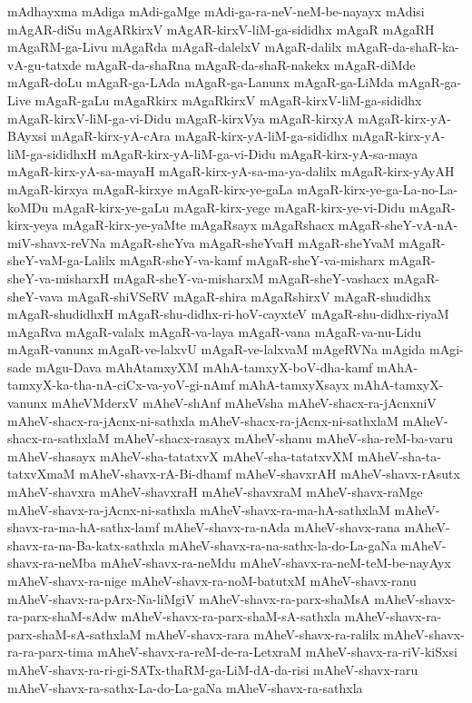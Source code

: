 {mAdhayxma
mAdiga
mAdi-gaMge
mAdi-ga-ra-neV-neM-be-nayayx
mAdisi
mAgAR-diSu
mAgARkirxV
mAgAR-kirxV-liM-ga-sididhx
mAgaR
mAgaRH
mAgaRM-ga-Livu
mAgaRda
mAgaR-dalelxV
mAgaR-dalilx
mAgaR-da-shaR-ka-vA-gu-tatxde
mAgaR-da-shaRna
mAgaR-da-shaR-nakekx
mAgaR-diMde
mAgaR-doLu
mAgaR-ga-LAda
mAgaR-ga-Lanunx
mAgaR-ga-LiMda
mAgaR-ga-Live
mAgaR-gaLu
mAgaRkirx
mAgaRkirxV
mAgaR-kirxV-liM-ga-sididhx
mAgaR-kirxV-liM-ga-vi-Didu
mAgaR-kirxVya
mAgaR-kirxyA
mAgaR-kirx-yA-BAyxsi
mAgaR-kirx-yA-cAra
mAgaR-kirx-yA-liM-ga-sididhx
mAgaR-kirx-yA-liM-ga-sididhxH
mAgaR-kirx-yA-liM-ga-vi-Didu
mAgaR-kirx-yA-sa-maya
mAgaR-kirx-yA-sa-mayaH
mAgaR-kirx-yA-sa-ma-ya-dalilx
mAgaR-kirx-yAyAH
mAgaR-kirxya
mAgaR-kirxye
mAgaR-kirx-ye-gaLa
mAgaR-kirx-ye-ga-La-no-La-koMDu
mAgaR-kirx-ye-gaLu
mAgaR-kirx-yege
mAgaR-kirx-ye-vi-Didu
mAgaR-kirx-yeya
mAgaR-kirx-ye-yaMte
mAgaRsayx
mAgaRshacx
mAgaR-sheY-vA-nA-miV-shavx-reVNa
mAgaR-sheYva
mAgaR-sheYvaH
mAgaR-sheYvaM
mAgaR-sheY-vaM-ga-Lalilx
mAgaR-sheY-va-kamf
mAgaR-sheY-va-misharx
mAgaR-sheY-va-misharxH
mAgaR-sheY-va-misharxM
mAgaR-sheY-vashacx
mAgaR-sheY-vava
mAgaR-shiVSeRV
mAgaR-shira
mAgaRshirxV
mAgaR-shudidhx
mAgaR-shudidhxH
mAgaR-shu-didhx-ri-hoV-cayxteV
mAgaR-shu-didhx-riyaM
mAgaRva
mAgaR-valalx
mAgaR-va-laya
mAgaR-vana
mAgaR-va-nu-Lidu
mAgaR-vanunx
mAgaR-ve-lalxvU
mAgaR-ve-lalxvaM
mAgeRVNa
mAgida
mAgi-sade
mAgu-Dava
mAhAtamxyXM
mAhA-tamxyX-boV-dha-kamf
mAhA-tamxyX-ka-tha-nA-ciCx-va-yoV-gi-nAmf
mAhA-tamxyXsayx
mAhA-tamxyX-vanunx
mAheVMderxV
mAheV-shAnf
mAheVsha
mAheV-shacx-ra-jAcnxniV
mAheV-shacx-ra-jAcnx-ni-sathxla
mAheV-shacx-ra-jAcnx-ni-sathxlaM
mAheV-shacx-ra-sathxlaM
mAheV-shacx-rasayx
mAheV-shanu
mAheV-sha-reM-ba-varu
mAheV-shasayx
mAheV-sha-tatatxvX
mAheV-sha-tatatxvXM
mAheV-sha-ta-tatxvXmaM
mAheV-shavx-rA-Bi-dhamf
mAheV-shavxrAH
mAheV-shavx-rAsutx
mAheV-shavxra
mAheV-shavxraH
mAheV-shavxraM
mAheV-shavx-raMge
mAheV-shavx-ra-jAcnx-ni-sathxla
mAheV-shavx-ra-ma-hA-sathxlaM
mAheV-shavx-ra-ma-hA-sathx-lamf
mAheV-shavx-ra-nAda
mAheV-shavx-rana
mAheV-shavx-ra-na-Ba-katx-sathxla
mAheV-shavx-ra-na-sathx-la-do-La-gaNa
mAheV-shavx-ra-neMba
mAheV-shavx-ra-neMdu
mAheV-shavx-ra-neM-teM-be-nayAyx
mAheV-shavx-ra-nige
mAheV-shavx-ra-noM-batutxM
mAheV-shavx-ranu
mAheV-shavx-ra-pArx-Na-liMgiV
mAheV-shavx-ra-parx-shaMsA
mAheV-shavx-ra-parx-shaM-sAdw
mAheV-shavx-ra-parx-shaM-sA-sathxla
mAheV-shavx-ra-parx-shaM-sA-sathxlaM
mAheV-shavx-rara
mAheV-shavx-ra-ralilx
mAheV-shavx-ra-ra-parx-tima
mAheV-shavx-ra-reM-de-ra-LetxraM
mAheV-shavx-ra-riV-kiSxsi
mAheV-shavx-ra-ri-gi-SATx-thaRM-ga-LiM-dA-da-risi
mAheV-shavx-raru
mAheV-shavx-ra-sathx-La-do-La-gaNa
mAheV-shavx-ra-sathxla
}
